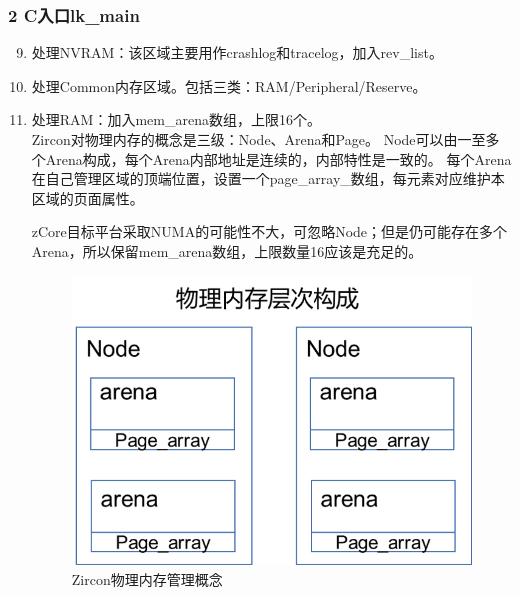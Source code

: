\documentclass[
8pt, %
]{beamer}
\begin{document}
	\begin{frame}
		\frametitle{2 C入口lk\_main}
		\begin{enumerate}\setcounter{enumi}{8}
			\item 处理NVRAM：该区域主要用作crashlog和tracelog，加入rev\_list。
			\item 处理Common内存区域。包括三类：RAM/Peripheral/Reserve。
			\item 处理RAM：加入mem\_arena数组，上限16个。\\
			Zircon对物理内存的概念是三级：Node、Arena和Page。
			Node可以由一至多个Arena构成，每个Arena内部地址是连续的，内部特性是一致的。
			每个Arena在自己管理区域的顶端位置，设置一个page\_array\_数组，每元素对应维护本区域的页面属性。
			\begin{block}{}
				zCore目标平台采取NUMA的可能性不大，可忽略Node；但是仍可能存在多个Arena，所以保留mem\_arena数组，上限数量16应该是充足的。
			\end{block}
			\begin{figure}
				\includegraphics[width=0.3\linewidth]{zircon_pmm.png}
				\caption{Zircon物理内存管理概念}
			\end{figure}
		\end{enumerate}
	\end{frame}
\end{document}
